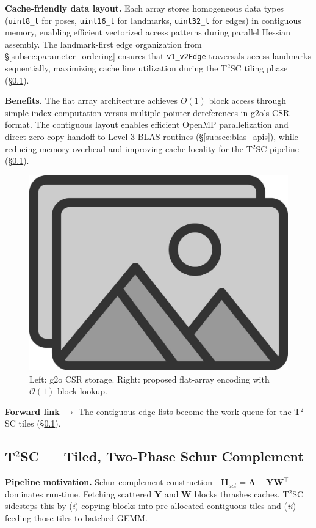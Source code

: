 \textbf{Cache-friendly data layout.} Each array stores homogeneous data types (\texttt{uint8\_t} for poses, \texttt{uint16\_t} 
for landmarks, \texttt{uint32\_t} for edges) in contiguous memory, enabling efficient vectorized access patterns during 
parallel Hessian assembly. The landmark-first edge organization from \S\ref{subsec:parameter_ordering} ensures 
that \texttt{v1\_v2Edge} traversals access landmarks sequentially, maximizing cache line utilization during 
the T$^2$SC tiling phase (\S\ref{subsec:t2sc}).

\textbf{Benefits.} The flat array architecture achieves $O(1)$ block access through simple index 
computation versus multiple pointer dereferences in g2o's CSR format. The contiguous layout enables 
efficient OpenMP parallelization and direct zero-copy handoff to Level-3 BLAS routines (\S\ref{subsec:blas_apis}), 
while reducing memory overhead and improving cache locality for the T$^2$SC pipeline (\S\ref{subsec:t2sc}).

\begin{figure}[t]
\centering
\includegraphics[width=0.75\linewidth]{figs/placeholder}
\caption{Left: g2o CSR storage. Right: proposed flat‑array encoding with $\mathcal O(1)$ block lookup.}
\label{fig:connectivity_storage}
\end{figure}

\textbf{Forward link} $\rightarrow$ The contiguous edge lists become the work‑queue for the T$^2$SC
tiles (§\ref{subsec:t2sc}).

\subsection{T$^2$SC --- Tiled, Two-Phase Schur Complement}
\label{subsec:t2sc}

\textbf{Pipeline motivation.} Schur complement construction—${\mathbf H}_{act}=\mathbf A-\mathbf Y\mathbf W^\top$—dominates run‑time.
Fetching scattered $\mathbf Y$ and $\mathbf W$ blocks thrashes caches. T$^{2}$SC sidesteps this by
(\emph{i}) copying blocks into pre‑allocated contiguous tiles and (\emph{ii}) feeding those tiles to
batched GEMM.

